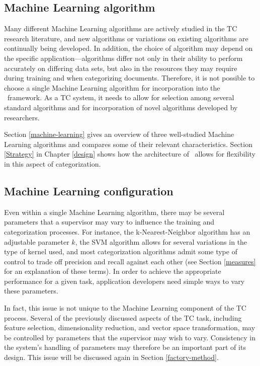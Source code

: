 \subsection{Machine Learning algorithm}

Many different Machine Learning algorithms are actively studied in the
TC research literature, and new algorithms or variations on existing
algorithms are continually being developed.  In addition, the choice
of algorithm may depend on the specific application---algorithms
differ not only in their ability to perform accurately on differing
data sets, but also in the resources they may require during training
and when categorizing documents.  Therefore, it is not possible to
choose a single Machine Learning algorithm for incorporation into the
\aicat\ framework.  As a TC system, it needs to allow for selection
among several standard algorithms and for incorporation of novel
algorithms developed by researchers.

Section \ref{machine-learning} gives an overview of three well-studied
Machine Learning algorithms and compares some of their relevant
characteristics.  Section \ref{Strategy} in Chapter \ref{design} shows
how the architecture of \aicat\ allows for flexibility in this aspect
of categorization.

\subsection{Machine Learning configuration}
\label{ml-config}

Even within a single Machine Learning algorithm, there may be several
parameters that a supervisor may vary to influence the training and
categorization processes.  For instance, the k-Nearest-Neighbor
algorithm has an adjustable parameter $k$, the SVM algorithm allows
for several variations in the type of kernel used, and most
categorization algorithms admit some type of control to trade off
precision and recall against each other (see Section \ref{measures}
for an explanation of these terms).  In order to achieve the
appropriate performance for a given task, application developers need
simple ways to vary these parameters.

In fact, this issue is not unique to the Machine Learning component of
the TC process.  Several of the previously discussed aspects of the TC
task, including feature selection, dimensionality reduction, and
vector space transformation, may be controlled by parameters that the
supervisor may wish to vary.  Consistency in the system's handling of
parameters may therefore be an important part of its design.  This
issue will be discussed again in Section \ref{factory-method}.

